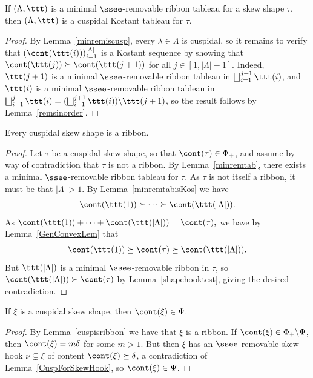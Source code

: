 \begin{lemma}\label{minremtabisKos}
If \((\Lambda,\ttt)\) is a minimal \(\ssee\)-removable ribbon tableau for a skew shape \(\tau\), then \((\Lambda,\ttt)\) is a cuspidal Kostant tableau for \(\tau\).
\end{lemma}
\begin{proof}
By Lemma~\ref{minremiscusp}, every \(\lambda \in \Lambda\) is cuspidal, so it remains to verify that \((\cont(\ttt(i)))_{i=1}^{|\Lambda|}\) is a Kostant sequence by showing that \(\cont(\ttt(j)) \succeq \cont(\ttt(j+1))\) for all \(j \in [1,|\Lambda|-1]\). Indeed, \(\ttt(j+1)\) is a minimal \(\ssee\)-removable ribbon tableau in \(\bigsqcup_{i=1}^{j+1}\ttt(i)\), and \(\ttt(i)\) is a minimal \(\ssee\)-removable ribbon tableau in \(\bigsqcup_{i=1}^{j} \ttt(i)= (\bigsqcup_{i=1}^{j+1}\ttt(i)) \backslash \ttt(j+1)\), so the result follows by Lemma~\ref{remsinorder}.
\end{proof}

\begin{lemma}\label{cuspisribbon}
Every cuspidal skew shape is a ribbon.
\end{lemma}
\begin{proof}
Let \(\tau\) be a cuspidal skew shape, so that \(\cont(\tau) \in \Phi_+\), and assume by way of contradiction that \(\tau\) is not a ribbon. By Lemma~\ref{minremtab}, there exists a minimal \(\ssee\)-removable ribbon tableau for \(\tau\). As \(\tau\) is not itself a ribbon, it must be that \(|\Lambda|>1\). By Lemma~\ref{minremtabisKos} we have 
\begin{align*}
\cont(\ttt(1)) \succeq \cdots \succeq \cont(\ttt(|\Lambda|)).
\end{align*}
As
\(
\cont(\ttt(1)) + \cdots + \cont(\ttt(|\Lambda|)) = \cont(\tau), 
\)
we have by Lemma~\ref{GenConvexLem} that
\begin{align*}
\cont(\ttt(1)) \succeq \cont(\tau)\succeq \cont(\ttt(|\Lambda|)).
\end{align*}
But \(\ttt(|\Lambda|)\) is a minimal \(\ssee\)-removable ribbon in \(\tau\), so \(\cont(\ttt(|\Lambda|)) \succ \cont(\tau)\) by Lemma~\ref{shapehooktest}, giving the desired contradiction.
\end{proof}

\begin{lemma}\label{cuspisindiv}
If \(\xi\) is a cuspidal skew shape, then \(\cont(\xi) \in \Psi\).
\end{lemma}
\begin{proof}
By Lemma~\ref{cuspisribbon} we have that \(\xi\) is a ribbon. If \(\cont(\xi) \in \Phi_+ \backslash \Psi\), then \(\cont(\xi) = m\delta\) for some \(m >1\). But then \(\xi\) has an \(\ssee\)-removable skew hook \(\nu \subsetneq \xi\) of content \(\cont(\xi) \succeq \delta\), a contradiction of Lemma~\ref{CuspForSkewHook}, so \(\cont(\xi) \in \Psi\).
\end{proof}



